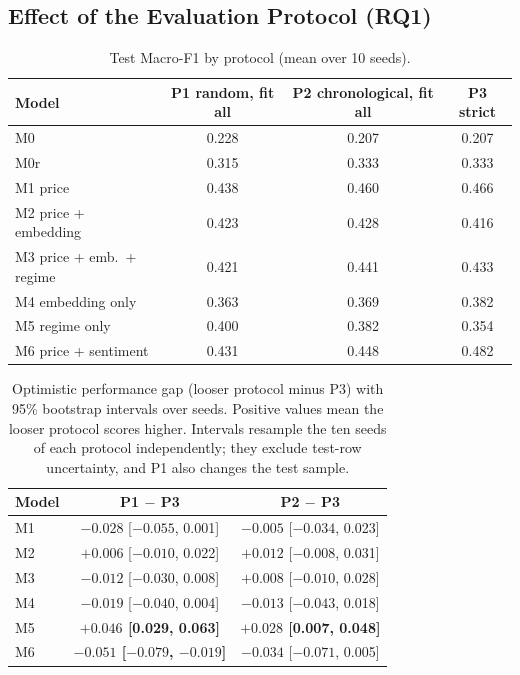 \subsection{Effect of the Evaluation Protocol (RQ1)}\label{sec:protocol-results}
\begin{table}[H]
\centering
\begin{tabular}{lccc}
\toprule
Model & P1 random, fit all & P2 chronological, fit all & P3 strict\\
\midrule
M0 & 0.228 & 0.207 & 0.207\\
M0r & 0.315 & 0.333 & 0.333\\
M1 price & 0.438 & 0.460 & 0.466\\
M2 price + embedding & 0.423 & 0.428 & 0.416\\
M3 price + emb.\ + regime & 0.421 & 0.441 & 0.433\\
M4 embedding only & 0.363 & 0.369 & 0.382\\
M5 regime only & 0.400 & 0.382 & 0.354\\
M6 price + sentiment & 0.431 & 0.448 & 0.482\\
\bottomrule
\end{tabular}
\caption{Test Macro-F1 by protocol (mean over 10 seeds).}
\end{table}
\begin{table}[H]
\centering
\begin{tabular}{lcc}
\toprule
Model & P1 $-$ P3 & P2 $-$ P3\\
\midrule
M1 & $-0.028$ [$-0.055$, 0.001] & $-0.005$ [$-0.034$, 0.023]\\
M2 & $+0.006$ [$-0.010$, 0.022] & $+0.012$ [$-0.008$, 0.031]\\
M3 & $-0.012$ [$-0.030$, 0.008] & $+0.008$ [$-0.010$, 0.028]\\
M4 & $-0.019$ [$-0.040$, 0.004] & $-0.013$ [$-0.043$, 0.018]\\
M5 & \textbf{$+0.046$ [0.029, 0.063]} & \textbf{$+0.028$ [0.007, 0.048]}\\
M6 & \textbf{$-0.051$ [$-0.079$, $-0.019$]} & $-0.034$ [$-0.071$, 0.005]\\
\bottomrule
\end{tabular}
\caption[Protocol gaps (looser protocol minus P3) with 95\% intervals]{Optimistic performance gap (looser protocol minus P3) with 95\% bootstrap intervals over seeds. Positive values mean the looser protocol scores higher. Intervals resample the ten seeds of each protocol independently; they exclude test-row uncertainty, and P1 also changes the test sample.}\label{tab:gaps}
\end{table}
